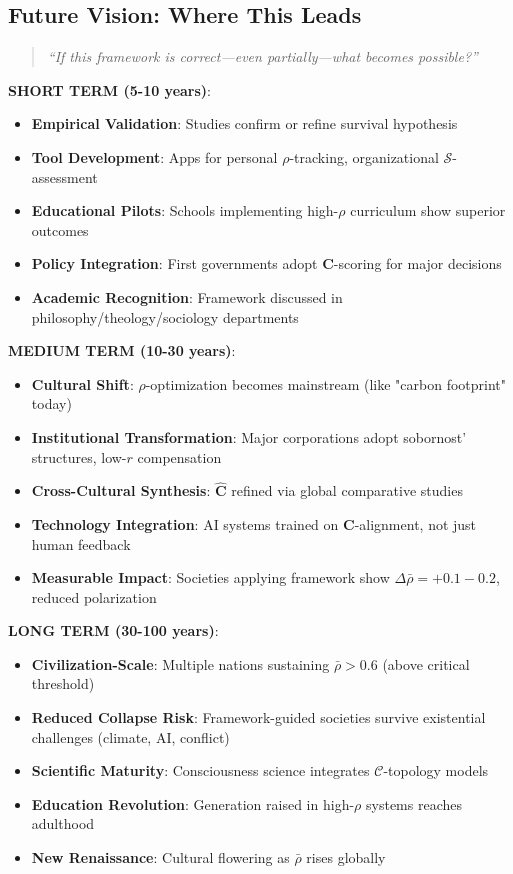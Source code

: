 \documentclass[11pt,a4paper]{article}
\theoremstyle{definition}
\theoremstyle{remark}
\newcommand{\CC}{\mathcal{C}}
\begin{document}
\begin{enumerate}
\begin{protocol}
\subsection{Future Vision: Where This Leads}

\begin{quote}
\textit{``If this framework is correct—even partially—what becomes possible?''}
\end{quote}

\textbf{SHORT TERM (5-10 years)}:
\begin{itemize}
    \item \textbf{Empirical Validation}: Studies confirm or refine survival hypothesis
    \item \textbf{Tool Development}: Apps for personal \(\rho\)-tracking, organizational \(\mathcal{S}\)-assessment
    \item \textbf{Educational Pilots}: Schools implementing high-\(\rho\) curriculum show superior outcomes
    \item \textbf{Policy Integration}: First governments adopt \(\mathbf{C}\)-scoring for major decisions
    \item \textbf{Academic Recognition}: Framework discussed in philosophy/theology/sociology departments
\end{itemize}

\textbf{MEDIUM TERM (10-30 years)}:
\begin{itemize}
    \item \textbf{Cultural Shift}: \(\rho\)-optimization becomes mainstream (like "carbon footprint" today)
    \item \textbf{Institutional Transformation}: Major corporations adopt sobornost' structures, low-\(r\) compensation
    \item \textbf{Cross-Cultural Synthesis}: \(\hat{\mathbf{C}}\) refined via global comparative studies
    \item \textbf{Technology Integration}: AI systems trained on \(\mathbf{C}\)-alignment, not just human feedback
    \item \textbf{Measurable Impact}: Societies applying framework show \(\Delta\bar{\rho} = +0.1-0.2\), reduced polarization
\end{itemize}

\textbf{LONG TERM (30-100 years)}:
\begin{itemize}
    \item \textbf{Civilization-Scale}: Multiple nations sustaining \(\bar{\rho} > 0.6\) (above critical threshold)
    \item \textbf{Reduced Collapse Risk}: Framework-guided societies survive existential challenges (climate, AI, conflict)
    \item \textbf{Scientific Maturity}: Consciousness science integrates \(\CC\)-topology models
    \item \textbf{Education Revolution}: Generation raised in high-\(\rho\) systems reaches adulthood
    \item \textbf{New Renaissance}: Cultural flowering as \(\bar{\rho}\) rises globally
\end{itemize}


\end{protocol}
\end{enumerate}
\end{document}
